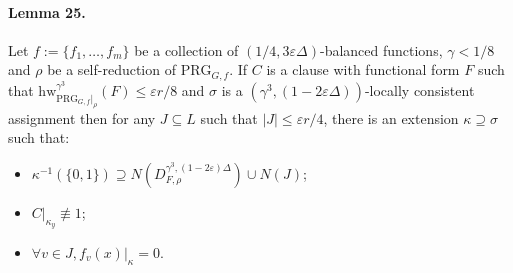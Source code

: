 \paragraph{Lemma 25.} Let $f:=\{f_1,\ldots,f_m\}$ be a collection of $(1/4,3\varepsilon\Delta)$-balanced functions, $\gamma<1/8$ and $\rho$ be a self-reduction of $\mathrm{PRG}_{G,f}$. If $C$ is a clause with functional form $F$ such that $\mathrm{hw}_{\mathrm{PRG}_{G,f}|_\rho}^{\gamma^3}(F)\leq\varepsilon r/8$ and $\sigma$ is a $(\gamma^3,(1-2\varepsilon\Delta))$-locally consistent assignment then for any $J\subseteq L$ such that $|J|\leq\varepsilon r/4$, there is an extension $\kappa\supseteq\sigma$ such that:
\begin{itemize}
\item $\kappa^{-1}(\{0,1\})\supseteq N(D_{F,\rho}^{\gamma^3,(1-2\varepsilon)\Delta})\cup N(J)$;
\item $C|_{\kappa_y}\not\equiv1$;
\item $\forall v\in J,f_v(x)|_\kappa=0$.
\end{itemize}
